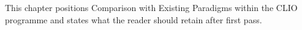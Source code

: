 This chapter positions Comparison with Existing Paradigms within the CLIO programme and states what the reader should retain after first pass.
